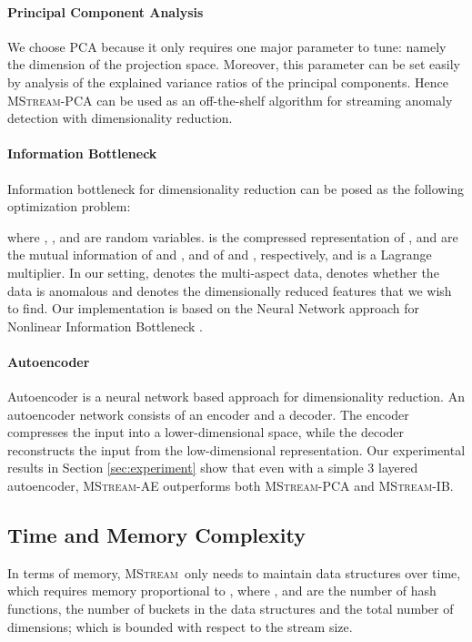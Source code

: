 \documentclass[sigconf]{acmart}
\newcommand{\method}{\textsc{MStream}}
\begin{document}
\paragraph{\textbf{Principal Component Analysis}}

We choose PCA because it only requires one major parameter to tune: namely the dimension of the projection space. Moreover, this parameter can be set easily by analysis of the explained variance ratios of the principal components. Hence \method-PCA can be used as an off-the-shelf algorithm for streaming anomaly detection with dimensionality reduction.

\paragraph{\textbf{Information Bottleneck}}
Information bottleneck for dimensionality reduction can be posed as the following optimization problem:

where , , and  are random variables.  is the compressed representation of ,  and  are the mutual information of  and , and of  and , respectively, and  is a Lagrange multiplier.
In our setting,  denotes the multi-aspect data,  denotes whether the data is anomalous and  denotes the dimensionally reduced features that we wish to find. Our implementation is based on the Neural Network approach for Nonlinear Information Bottleneck \cite{kolchinsky2017nonlinear}.


\paragraph{\textbf{Autoencoder}}
Autoencoder is a neural network based approach for dimensionality reduction. An autoencoder network consists of an encoder and a decoder. The encoder compresses the input into a lower-dimensional space, while the decoder reconstructs the input from the low-dimensional representation. Our experimental results in Section \ref{sec:experiment} show that even with a simple 3 layered autoencoder, \method-AE outperforms both \method-PCA and \method-IB.
 
\subsection{Time and Memory Complexity}
\label{sec:timecomplexity}
In terms of memory, \method\ only needs to maintain data structures over time, which requires memory proportional to , where ,  and  are the number of hash functions, the number of buckets in the data structures and the total number of dimensions; which is bounded with respect to the stream size.
\end{document}

